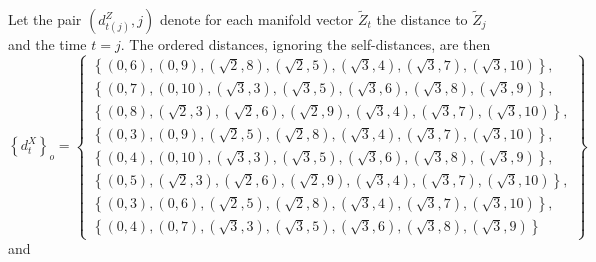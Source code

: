 Let the pair $\left(d_{t(j)}^Z,j\right)$ denote for each manifold vector $\tilde{Z}_t$ the distance to $\tilde{Z}_j$ and the time $t=j$.  The ordered distances, ignoring the self-distances, are then
\begin{equation}
\left\{d_{t}^X\right\}_o = \left\{\begin{array}{c} 
\left\{\left(0,6\right),\left(0,9\right),\left(\sqrt{2},8\right),\left(\sqrt{2},5\right),\left(\sqrt{3},4\right),\left(\sqrt{3},7\right),\left(\sqrt{3},10\right)\right\},\\
\left\{\left(0,7\right),\left(0,10\right),\left(\sqrt{3},3\right),\left(\sqrt{3},5\right),\left(\sqrt{3},6\right),\left(\sqrt{3},8\right),\left(\sqrt{3},9\right)\right\},\\
\left\{\left(0,8\right),\left(\sqrt{2},3\right),\left(\sqrt{2},6\right),\left(\sqrt{2},9\right),\left(\sqrt{3},4\right),\left(\sqrt{3},7\right),\left(\sqrt{3},10\right)\right\},\\
\left\{\left(0,3\right),\left(0,9\right),\left(\sqrt{2},5\right),\left(\sqrt{2},8\right),\left(\sqrt{3},4\right),\left(\sqrt{3},7\right),\left(\sqrt{3},10\right)\right\},\\
\left\{\left(0,4\right),\left(0,10\right),\left(\sqrt{3},3\right),\left(\sqrt{3},5\right),\left(\sqrt{3},6\right),\left(\sqrt{3},8\right),\left(\sqrt{3},9\right)\right\},\\
\left\{\left(0,5\right),\left(\sqrt{2},3\right),\left(\sqrt{2},6\right),\left(\sqrt{2},9\right),\left(\sqrt{3},4\right),\left(\sqrt{3},7\right),\left(\sqrt{3},10\right)\right\},\\
\left\{\left(0,3\right),\left(0,6\right),\left(\sqrt{2},5\right),\left(\sqrt{2},8\right),\left(\sqrt{3},4\right),\left(\sqrt{3},7\right),\left(\sqrt{3},10\right)\right\},\\
\left\{\left(0,4\right),\left(0,7\right),\left(\sqrt{3},3\right),\left(\sqrt{3},5\right),\left(\sqrt{3},6\right),\left(\sqrt{3},8\right),\left(\sqrt{3},9\right)\right\}
\end{array}\right\}
\end{equation}
and
